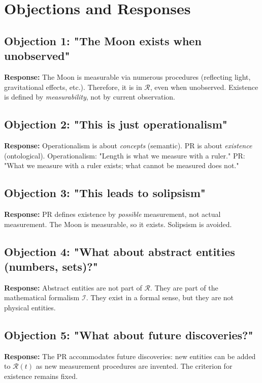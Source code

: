 \documentclass[aps,preprint,showpacs,showkeys]{revtex4}
\begin{document}
\section{Objections and Responses}

\subsection{Objection 1: "The Moon exists when unobserved"}

\textbf{Response:} The Moon is measurable via numerous procedures
(reflecting light, gravitational effects, etc.). Therefore, it is in $%
\mathcal{R}$, even when unobserved. Existence is defined by \emph{%
measurability}, not by current observation.

\subsection{Objection 2: "This is just operationalism"}

\textbf{Response:} Operationalism is about \emph{concepts} (semantic). PR is
about \emph{existence} (ontological). Operationalism: "Length is what we
measure with a ruler." PR: "What we measure with a ruler exists; what cannot
be measured does not."

\subsection{Objection 3: "This leads to solipsism"}

\textbf{Response:} PR defines existence by \emph{possible} measurement, not
actual measurement. The Moon is measurable, so it exists. Solipsism is
avoided.

\subsection{Objection 4: "What about abstract entities (numbers, sets)?"}

\textbf{Response:} Abstract entities are not part of $\mathcal{R}$. They are
part of the mathematical formalism $\mathcal{I}$. They exist in a formal
sense, but they are not physical entities.

\subsection{Objection 5: "What about future discoveries?"}

\textbf{Response:} The PR accommodates future discoveries: new entities can
be added to $\mathcal{R}(t)$ as new measurement procedures are invented. The
criterion for existence remains fixed.
\end{document}
